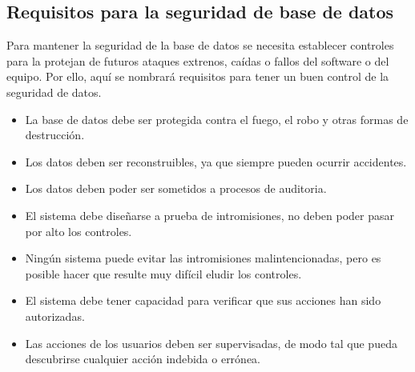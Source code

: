 \documentclass[%
 reprint,
 amsmath,amssymb,
 aps,
]{revtex4-1}
\begin{document}
\subsection{Requisitos para la seguridad de base de datos}
Para mantener la seguridad de la base de datos se necesita establecer controles para la protejan de futuros ataques extrenos, caídas o fallos del software o del equipo. Por ello, aquí se nombrará requisitos para tener un buen control de la seguridad de datos.
\begin{itemize}
\item La base de datos debe ser protegida contra el fuego, el robo y otras
formas de destrucción.
\item Los datos deben ser reconstruibles, ya que siempre pueden ocurrir
accidentes.
\item Los datos deben poder ser sometidos a procesos de auditoria.
\item El sistema debe diseñarse a prueba de intromisiones, no deben
poder pasar por alto los controles.
\item Ningún sistema puede evitar las intromisiones malintencionadas,
pero es posible hacer que resulte muy difícil eludir los controles.
\item El sistema debe tener capacidad para verificar que sus acciones han
sido autorizadas.
\item Las acciones de los usuarios deben ser supervisadas, de modo tal
que pueda descubrirse cualquier acción indebida o errónea. \cite{book1}
\end{itemize}
\end{document}
